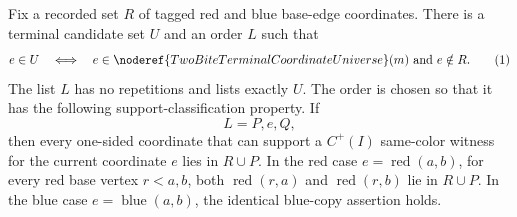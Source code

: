 \begin{helper}
Fix a recorded set \(R\) of tagged red and blue base-edge coordinates.  There
is a terminal candidate set \(U\) and an order \(L\) such that
\[
e\in U
\quad\Longleftrightarrow\quad
e\in\noderef{TwoBiteTerminalCoordinateUniverse}(m)
\hbox{ and }e\notin R.
\tag{1}
\]
The list \(L\) has no repetitions and lists exactly \(U\).  The order is
chosen so that it has the following support-classification property.  If
\[
L=P,e,Q,
\]
then every one-sided coordinate that can support a \(C^+(I)\) same-color
witness for the current coordinate \(e\) lies in \(R\cup P\).  In the red case
\(e=\operatorname{red}(a,b)\), for every red base vertex \(r<a,b\), both
\(\operatorname{red}(r,a)\) and \(\operatorname{red}(r,b)\) lie in
\(R\cup P\).  In the blue case \(e=\operatorname{blue}(a,b)\), the identical
blue-copy assertion holds.
\end{helper}

